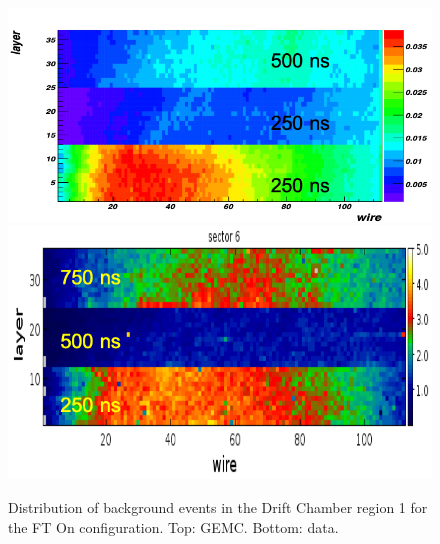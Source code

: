 \begin{figure}
	\centering
	\includegraphics[width=0.99\columnwidth,keepaspectratio]{img/ftOnGemcDCRates.png}
	\includegraphics[width=0.99\columnwidth,keepaspectratio]{img/ftOnDataDCRates.png}
	\caption{Distribution of background events in the Drift Chamber region 1 for the FT On configuration.
             Top: GEMC. Bottom: data.}
	\label{fig:ftOnComparison}
\end{figure}


